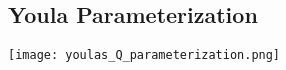 \subsection{Youla Parameterization}

\begin{center}
    \texttt{[image: youlas\_Q\_parameterization.png]}
\end{center}

